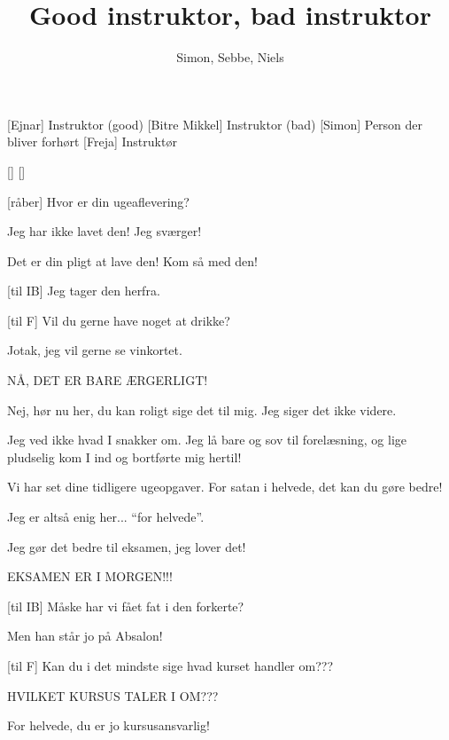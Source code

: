 \documentclass[a4paper,11pt]{article}
\title{Good instruktor, bad instruktor}
\author{Simon, Sebbe, Niels}
\begin{document}
\maketitle

\begin{roles}
[Ejnar] Instruktor (good)
[Bitre Mikkel] Instruktor (bad)
[Simon] Person der bliver forhørt
[Freja] Instruktør
\end{roles}

\begin{props}
[]
[]
\end{props}

\begin{sketch}

[råber] Hvor er din ugeaflevering?

 Jeg har ikke lavet den!  Jeg sværger!

 Det er din pligt at lave den!  Kom så med den!


[til IB] Jeg tager den herfra.

[til F] Vil du gerne have noget at drikke?

 Jotak, jeg vil gerne se vinkortet.

 NÅ, DET ER BARE ÆRGERLIGT!

 Nej, hør nu her, du kan roligt sige det til mig.  Jeg siger det ikke
videre.

 Jeg ved ikke hvad I snakker om.  Jeg lå bare og sov til forelæsning, og
lige pludselig kom I ind og bortførte mig hertil!

 Vi har set dine tidligere ugeopgaver.  For satan i helvede, det kan du
gøre bedre!

 Jeg er altså enig her... ``for helvede''.

 Jeg gør det bedre til eksamen, jeg lover det!

 EKSAMEN ER I MORGEN!!!

[til IB] Måske har vi fået fat i den forkerte?

 Men han står jo på Absalon!

[til F] Kan du i det mindste sige hvad kurset handler om???

 HVILKET KURSUS TALER I OM???

 For helvede, du er jo kursusansvarlig!

\end{sketch}
\end{document}
